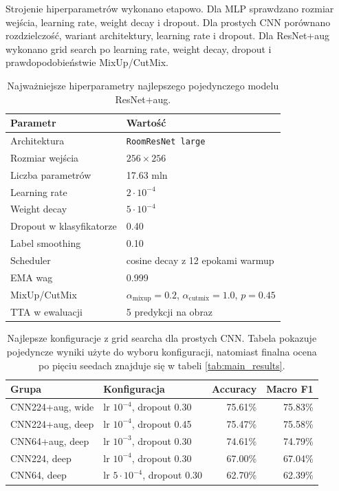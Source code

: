 \documentclass[12pt,a4paper]{article}
\begin{document}
Strojenie hiperparametrów wykonano etapowo. Dla MLP sprawdzano rozmiar wejścia, learning rate, weight decay i dropout. Dla prostych CNN porównano rozdzielczość, wariant architektury, learning rate i dropout. Dla ResNet+aug wykonano grid search po learning rate, weight decay, dropout i prawdopodobieństwie MixUp/CutMix.

\begin{table}[H]
\centering
\caption{Najważniejsze hiperparametry najlepszego pojedynczego modelu ResNet+aug.}
\label{tab:best_hparams}
\begin{tabular}{ll}
\toprule
Parametr & Wartość \\
\midrule
Architektura & \texttt{RoomResNet large} \\
Rozmiar wejścia & \(256 \times 256\) \\
Liczba parametrów & 17.63 mln \\
Learning rate & \(2 \cdot 10^{-4}\) \\
Weight decay & \(5 \cdot 10^{-4}\) \\
Dropout w klasyfikatorze & 0.40 \\
Label smoothing & 0.10 \\
Scheduler & cosine decay z 12 epokami warmup \\
EMA wag & 0.999 \\
MixUp/CutMix & \(\alpha_{\text{mixup}}=0.2\), \(\alpha_{\text{cutmix}}=1.0\), \(p=0.45\) \\
TTA w ewaluacji & 5 predykcji na obraz \\
\bottomrule
\end{tabular}
\end{table}

\begin{table}[H]
\centering
\caption{Najlepsze konfiguracje z grid searcha dla prostych CNN. Tabela pokazuje pojedyncze wyniki użyte do wyboru konfiguracji, natomiast finalna ocena po pięciu seedach znajduje się w tabeli \ref{tab:main_results}.}
\label{tab:simple_cnn_grid_results}
\small
\begin{tabular}{@{}llrr@{}}
\toprule
Grupa & Konfiguracja & Accuracy & Macro F1 \\
\midrule
CNN224+aug, wide & lr \(10^{-4}\), dropout 0.30 & 75.61\% & 75.83\% \\
CNN224+aug, deep & lr \(10^{-4}\), dropout 0.45 & 75.47\% & 75.58\% \\
CNN64+aug, deep & lr \(10^{-3}\), dropout 0.30 & 74.61\% & 74.79\% \\
CNN224, deep & lr \(10^{-4}\), dropout 0.30 & 67.00\% & 67.04\% \\
CNN64, deep & lr \(5 \cdot 10^{-4}\), dropout 0.30 & 62.70\% & 62.39\% \\
\bottomrule
\end{tabular}
\end{table}
\end{document}
